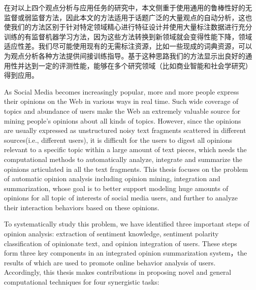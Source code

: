 \begin{cabstract}
在对以上四个观点分析与应用任务的研究中，本文侧重于使用通用的鲁棒性好的无监督或弱监督方法，因此本文的方法适用于话题广泛的大量观点的自动分析，这也使我们的方法区别于针对特定领域精心进行特征设计并使用大量标注数据进行充分训练的有监督机器学习方法，因为这些方法转换到新领域就会变得性能下降，领域适应性差。我们尽可能使用现有的无需标注资源，比如一些现成的词典资源，可以为观点分析各种方法提供间接训练指导。基于这种思路我们的方法显示出良好的通用性并达到一定的评测性能，能够在多个研究领域（比如商业智能和社会学研究）得到应用。


\end{cabstract}

\begin{eabstract}

As Social Media becomes increasingly popular, more and more people express their opinions on the Web in various ways in real time. Such wide coverage of topics and abundance of users make the Web an extremely valuable source for mining people's opinions about all kinds of topics. However, since the opinions are usually expressed as unstructured noisy text fragments scattered in different sources(i.e., different users), it is difficult for the users to digest all opinions relevant to a specific topic within a large amount of text pieces, which needs the computational methods to automatically analyze, integrate and summarize the opinions articulated in all the text fragments. This thesis focuses on the problem of automatic opinion analysis including opinion mining, integration and summarization, whose goal is to better support modeling huge amounts of opinions for all topic of interests of social media users, and further to analyze their interaction behaviors based on these opinions. 

To systematically study this problem, we have identified three important steps of opinion analysis: extraction of sentiment knowledge, sentiment polarity classification of opinionate text, and opinion integration of users. These steps form three key components in an integrated opinion summarization system，the results of which are used to promote online behavior analysis of users. Accordingly, this thesis makes contributions in proposing novel and general computational techniques for four synergistic tasks: 


\end{eabstract}
